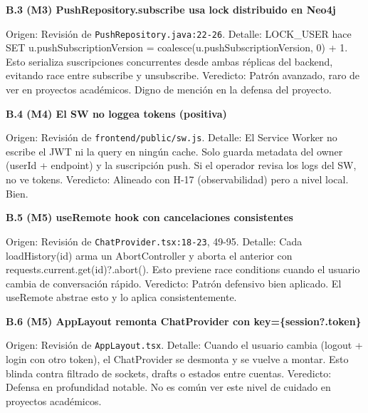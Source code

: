 \documentclass[10pt,a4paper]{article}
\newcommand{\code}[1]{\nolinkurl{#1}}
\begin{document}
\vspace{0.6em}\noindent\textbf{\normalsize B.3 (M3) PushRepository.subscribe usa lock distribuido en Neo4j}\par\vspace{0.2em}
Origen: Revisión de \code{PushRepository.java:22-26}.  Detalle: LOCK\_USER hace SET u.pushSubscriptionVersion = coalesce(u.pushSubscriptionVersion, 0) + 1. Esto serializa suscripciones concurrentes desde ambas réplicas del backend, evitando race entre subscribe y unsubscribe.  Veredicto: Patrón avanzado, raro de ver en proyectos académicos. Digno de mención en la defensa del proyecto.\par\vspace{0.4em}
\vspace{0.6em}\noindent\textbf{\normalsize B.4 (M4) El SW no loggea tokens (positiva)}\par\vspace{0.2em}
Origen: Revisión de \code{frontend/public/sw.js}.  Detalle: El Service Worker no escribe el JWT ni la query en ningún cache. Solo guarda metadata del owner (userId + endpoint) y la suscripción push. Si el operador revisa los logs del SW, no ve tokens.  Veredicto: Alineado con H-17 (observabilidad) pero a nivel local. Bien.\par\vspace{0.4em}
\vspace{0.6em}\noindent\textbf{\normalsize B.5 (M5) useRemote hook con cancelaciones consistentes}\par\vspace{0.2em}
Origen: Revisión de \code{ChatProvider.tsx:18-23}, 49-95.  Detalle: Cada loadHistory(id) arma un AbortController y aborta el anterior con requests.current.get(id)?.abort(). Esto previene race conditions cuando el usuario cambia de conversación rápido.  Veredicto: Patrón defensivo bien aplicado. El useRemote abstrae esto y lo aplica consistentemente.\par\vspace{0.4em}
\vspace{0.6em}\noindent\textbf{\normalsize B.6 (M5) AppLayout remonta ChatProvider con key=\{session?.token\}}\par\vspace{0.2em}
Origen: Revisión de \code{AppLayout.tsx}.  Detalle: Cuando el usuario cambia (logout + login con otro token), el ChatProvider se desmonta y se vuelve a montar. Esto blinda contra filtrado de sockets, drafts o estados entre cuentas.  Veredicto: Defensa en profundidad notable. No es común ver este nivel de cuidado en proyectos académicos.\par\vspace{0.4em}
\end{document}
